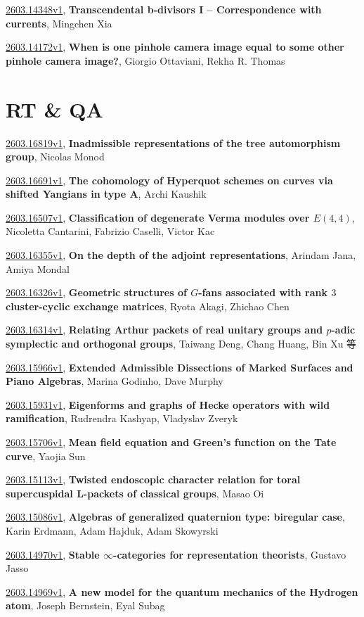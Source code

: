 \documentclass[9pt, a4paper]{article}
\theoremstyle{plain}
\theoremstyle{definition}
\theoremstyle{remark}
\newcommand{\arxiv}[3]{\href{https://arxiv.org/abs/#1}{#1}, \textbf{\textcolor{arxivblue}{#2}}, #3}
\begin{document}
\arxiv{2603.14348v1}{Transcendental b-divisors I -- Correspondence with currents}{Mingchen Xia}

\arxiv{2603.14172v1}{When is one pinhole camera image equal to some other pinhole camera image?}{Giorgio Ottaviani, Rekha R. Thomas}


\section{RT \& QA}
\arxiv{2603.16819v1}{Inadmissible representations of the tree automorphism group}{Nicolas Monod}

\arxiv{2603.16691v1}{The cohomology of Hyperquot schemes on curves via shifted Yangians in type A}{Archi Kaushik}

\arxiv{2603.16507v1}{Classification of degenerate Verma modules over $E(4,4)$}{Nicoletta Cantarini, Fabrizio Caselli, Victor Kac}

\arxiv{2603.16355v1}{On the depth of the adjoint representations}{Arindam Jana, Amiya Mondal}

\arxiv{2603.16326v1}{Geometric structures of $G$-fans associated with rank $3$ cluster-cyclic exchange matrices}{Ryota Akagi, Zhichao Chen}

\arxiv{2603.16314v1}{Relating Arthur packets of real unitary groups and $p$-adic symplectic and orthogonal groups}{Taiwang Deng, Chang Huang, Bin Xu 等}

\arxiv{2603.15966v1}{Extended Admissible Dissections of Marked Surfaces and Piano Algebras}{Marina Godinho, Dave Murphy}

\arxiv{2603.15931v1}{Eigenforms and graphs of Hecke operators with wild ramification}{Rudrendra Kashyap, Vladyslav Zveryk}

\arxiv{2603.15706v1}{Mean field equation and Green's function on the Tate curve}{Yaojia Sun}

\arxiv{2603.15113v1}{Twisted endoscopic character relation for toral supercuspidal L-packets of classical groups}{Masao Oi}

\arxiv{2603.15086v1}{Algebras of generalized quaternion type: biregular case}{Karin Erdmann, Adam Hajduk, Adam Skowyrski}

\arxiv{2603.14970v1}{Stable $\infty$-categories for representation theorists}{Gustavo Jasso}

\arxiv{2603.14969v1}{A new model for the quantum mechanics of the Hydrogen atom}{Joseph Bernstein, Eyal Subag}
\end{document}
